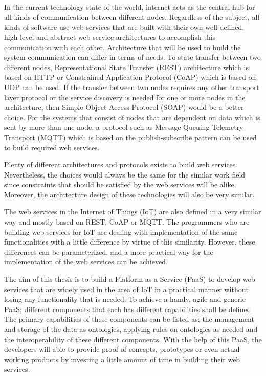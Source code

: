 \chapter{\abstractname}

In the current technology state of the world, internet acts as the central hub for all kinds of communication between different nodes. Regardless of the subject, all kinds of software use web services that are built with their own well-defined, high-level and abstract web service architectures to accomplish this communication with each other. Architecture that will be used to build the system communication can differ in terms of needs. To state transfer between two different nodes, Representational State Transfer (REST) architecture which is based on HTTP or Constrained Application Protocol (CoAP) which is based on UDP can be used. If the transfer between two nodes requires any other transport layer protocol or the service discovery is needed for one or more nodes in the architecture, then Simple Object Access Protocol (SOAP) would be a better choice. For the systems that consist of nodes that are dependent on data which is sent by more than one node, a protocol such as Message Queuing Telemetry Transport (MQTT) which is based on the publish-subscribe pattern can be used to build required web services.

Plenty of different architectures and protocols exists to build web services. Nevertheless, the choices would always be the same for the similar work field since constraints that should be satisfied by the web services will be alike. Moreover, the architecture design of these technologies will also be very similar.

The web services in the Internet of Things (IoT) are also defined in a very similar way and mostly based on REST, CoAP or MQTT. The programmers who are building web services for IoT are dealing with implementation of the same functionalities with a little difference by virtue of this similarity. However, these differences can be parameterized, and a more practical way for the implementation of the web services can be achieved.

The aim of this thesis is to build a Platform as a Service (PaaS) to develop web services that are widely used in the area of IoT in a practical manner without losing any functionality that is needed. To achieve a handy, agile and generic PaaS; different components that each has different capabilities shall be defined. The primary capabilities of these components can be listed as; the management and storage of the data as ontologies, applying rules on ontologies as needed and the interoperability of these different components. With the help of this PaaS, the developers will able to provide proof of concepts, prototypes or even actual working products by investing a little amount of time in building their web services.
